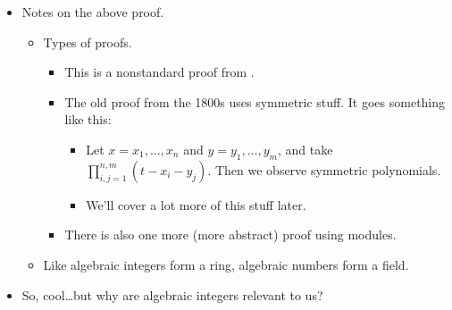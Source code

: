 \documentclass[../notes.tex]{subfiles}
\begin{document}
\begin{itemize}
    \begin{proof}
        Since $x,y\in\bar{\Z}$, the lemma implies that there exist $A,B,v,w$ such that
        \begin{align*}
            Av &= xv&
            Bw &= yw
        \end{align*}
        Note that $A$ can be of dimension $n\times n$ and $B$ of dimension $m\times m$, i.e., they need not be the same dimension. Now how do we find a matrix for which the sum $x+y$ and product $xy$ are eigenvalues? We use the tensor/Kronecker product to start! In particular,
        \begin{equation*}
            (A\otimes B)(v\otimes w) = xy(v\otimes w)
        \end{equation*}
        For sum, we take $A\otimes I_m+I_n\otimes B$ so that
        \begin{equation*}
            (A\otimes I_m+I_n\otimes B)(v\otimes w) = xv\otimes w+v\otimes yw
            = (x+y)v\otimes w
        \end{equation*}
        It follows by the two lines above and Fact 3 that $xy,x+y\in\bar{\Z}$, as desired.
    \end{proof}
    \item Notes on the above proof.
    \begin{itemize}
        \item Types of proofs.
        \begin{itemize}
            \item This is a nonstandard proof from \textcite{bib:Etingof}.
            \item The old proof from the 1800s uses symmetric stuff. It goes something like this:
            \begin{itemize}
                \item Let $x=x_1,\dots,x_n$ and $y=y_1,\dots,y_m$, and take $\prod_{i,j=1}^{n,m}(t-x_i-y_j)$. Then we observe symmetric polynomials.
                \item We'll cover a lot more of this stuff later.
            \end{itemize}
            \item There is also one more (more abstract) proof using modules.
        \end{itemize}
        \item Like algebraic integers form a ring, algebraic numbers form a field.
    \end{itemize}
    \item So, cool\dots but why are algebraic integers relevant to us?

\end{itemize}
\end{document}
